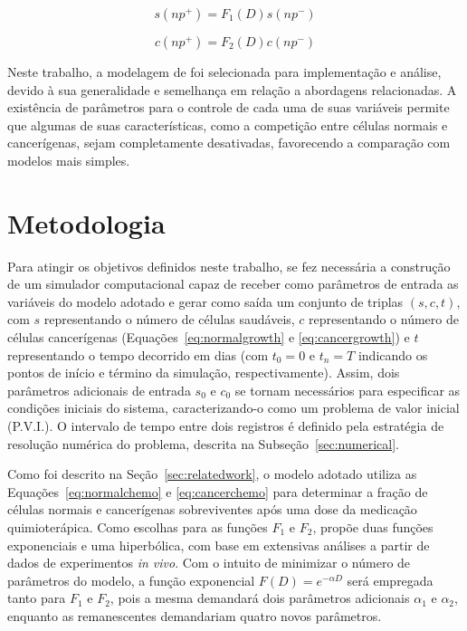 \documentclass[12pt]{article}
\begin{document}
\begin{equation} \label{eq:normalchemo}
  s(np^{+}) = F_{1}(D) s(np^{-})
\end{equation}

\begin{equation} \label{eq:cancerchemo}
  c(np^{+}) = F_{2}(D) c(np^{-})
\end{equation}



Neste trabalho, a modelagem de \cite{Panetta1996} foi selecionada para implementação e análise, devido à sua generalidade e semelhança em relação a abordagens relacionadas. A existência de parâmetros para o controle de cada uma de suas variáveis permite que algumas de suas características, como a competição entre células normais e cancerígenas, sejam completamente desativadas, favorecendo a comparação com modelos mais simples.

\section{Metodologia} \label{sec:methodology} %

Para atingir os objetivos definidos neste trabalho, se fez necessária a construção de um simulador computacional capaz de receber como parâmetros de entrada as variáveis do modelo adotado e gerar como saída um conjunto de triplas $(s, c, t)$, com $s$ representando o número de células saudáveis, $c$ representando o número de células cancerígenas (Equações~\ref{eq:normalgrowth} e \ref{eq:cancergrowth}) e $t$ representando o tempo decorrido em dias (com $t_{0} = 0$ e $t_{n} = T$ indicando os pontos de início e término da simulação, respectivamente).
Assim, dois parâmetros adicionais de entrada $s_{0}$ e $c_{0}$ se tornam necessários para especificar as condições iniciais do sistema, caracterizando-o como um problema de valor inicial (P.V.I.). O intervalo de tempo entre dois registros é definido pela estratégia de resolução numérica do problema, descrita na Subseção~\ref{sec:numerical}.

Como foi descrito na Seção~\ref{sec:relatedwork}, o modelo adotado utiliza as Equações~\ref{eq:normalchemo} e \ref{eq:cancerchemo} para determinar a fração de células normais e cancerígenas sobreviventes após uma dose da medicação quimioterápica.
Como escolhas para as funções $F_1$ e $F_2$, \cite{Berenbaum1969} propõe duas funções exponenciais e uma hiperbólica, com base em extensivas análises a partir de dados de experimentos \textit{in vivo}. Com o intuito de minimizar o número de parâmetros do modelo, a função exponencial $F(D) = e^{- \alpha D}$ será empregada tanto para $F_1$ e $F_2$, pois a mesma demandará dois parâmetros adicionais $\alpha_1$ e $\alpha_2$, enquanto as remanescentes demandariam quatro novos parâmetros.
\end{document}
